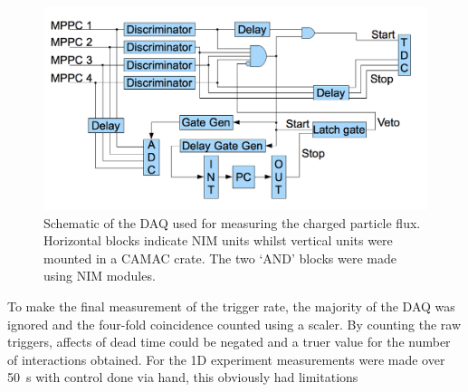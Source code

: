 \begin{figure}[hptb]
  \centering
  \includegraphics[width=.9\textwidth]{images/charged_flux/MuSIC1_DAQ_Block.png}
  \caption{Schematic of the DAQ used for measuring the charged particle flux. Horizontal blocks indicate NIM units whilst vertical units were mounted in a CAMAC crate. The two `AND' blocks were made using NIM modules.}
  \label{fig:MuSIC1_DAQ_Block}
\end{figure}

To make the final measurement of the trigger rate, the majority of the DAQ was ignored and the four-fold coincidence counted using a scaler. By counting the raw triggers, affects of dead time could be negated and a truer value for the number of interactions obtained. For the 1D experiment measurements were made over 50~s with control done via hand, this obviously had limitations 

